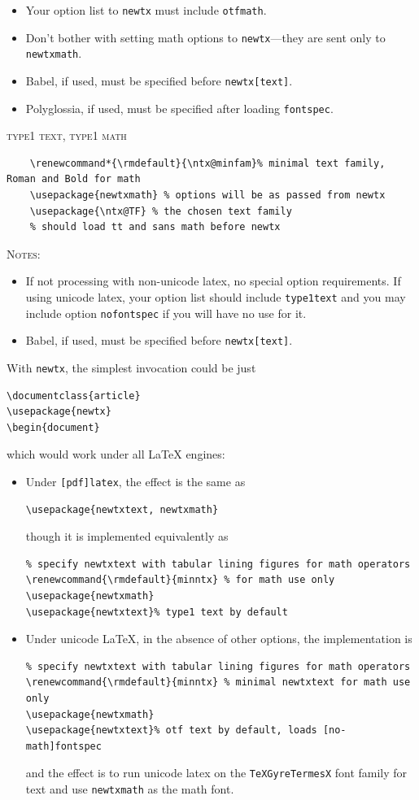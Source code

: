 \documentclass[\fsc]{article}
\theoremstyle{oldplain}
\theoremstyle{plain}
\begin{document}
\begin{itemize}
\item Your option list to {\tt newtx} must include {\tt otfmath}. 
\item Don't bother with setting math options to {\tt newtx}---they are sent only to {\tt newtxmath}.
\item Babel, if used, must be specified before {\tt newtx[text]}.
\item Polyglossia, if used, must be specified after loading {\tt fontspec}.
\end{itemize}

\textsc{type1 text, type1 math}
\begin{verbatim}
    \renewcommand*{\rmdefault}{\ntx@minfam}% minimal text family, Roman and Bold for math
    \usepackage{newtxmath} % options will be as passed from newtx
    \usepackage{\ntx@TF} % the chosen text family
    % should load tt and sans math before newtx
\end{verbatim}
\textsc{Notes:}

\begin{itemize}
\item If not processing with non-unicode latex, no special option requirements. If using unicode latex, your option list should include {\tt type1text} and you may include option {\tt nofontspec} if you will have no use for it.
\item Babel, if used, must be specified before {\tt newtx[text]}.
\end{itemize}

 With {\tt newtx}, the simplest invocation could be just
\begin{verbatim}
\documentclass{article}
\usepackage{newtx}
\begin{document}
\end{verbatim}
which would work under all LaTeX engines:
\begin{itemize}
\item
Under {\tt [pdf]latex}, the effect is the same as
\begin{verbatim}
\usepackage{newtxtext, newtxmath}
\end{verbatim}
though it is implemented equivalently as
\begin{verbatim}
% specify newtxtext with tabular lining figures for math operators
\renewcommand{\rmdefault}{minntx} % for math use only
\usepackage{newtxmath}
\usepackage{newtxtext}% type1 text by default
\end{verbatim}

\item Under unicode LaTeX, in the absence of other options, the implementation is
\begin{verbatim}
% specify newtxtext with tabular lining figures for math operators
\renewcommand{\rmdefault}{minntx} % minimal newtxtext for math use only
\usepackage{newtxmath}
\usepackage{newtxtext}% otf text by default, loads [no-math]fontspec
\end{verbatim}
and the effect is to run unicode latex on the {\tt TeXGyreTermesX} font family for text and use {\tt newtxmath} as the math font.
\end{itemize}
\end{document}
